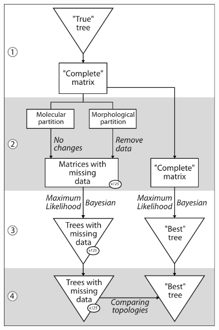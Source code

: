 \documentclass[12pt,letterpaper]{article}
\begin{document}
\newpage
\begin{figure}[!htbp]
\centering
    \includegraphics[keepaspectratio=true]{Figures/In_main/Simulations_outline-BW.pdf}
\caption{ }
\end{figure}
\end{document}

